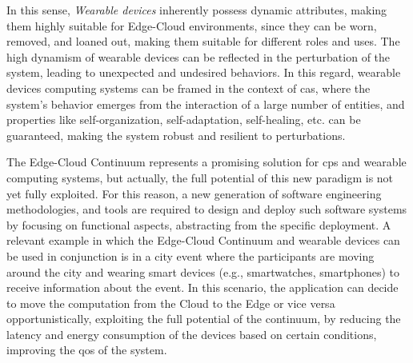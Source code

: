 \documentclass[12pt,a4paper]{article}
\newcommand{\meta}[1]{{\color{blue}#1}}
\begin{document}
In this sense,
\emph{Wearable devices} inherently possess dynamic attributes, making them highly suitable for Edge-Cloud environments,
since they can be worn,
removed, and loaned out,
making them suitable for different roles and uses.
%
The high dynamism of wearable devices can be reflected in the perturbation of the system,
leading to unexpected and undesired behaviors.
%
In this regard,
wearable devices computing systems can be framed in the context of \ac{cas},
where the system's behavior emerges from the interaction of a large number of entities,
and properties like self-organization, self-adaptation, self-healing, etc. can be guaranteed,
making the system robust and resilient to perturbations.

The Edge-Cloud Continuum represents a promising solution for \ac{cps} and wearable computing systems,
but actually,
the full potential of this new paradigm is not yet fully exploited.
%
For this reason,
a new generation of software engineering methodologies,
and tools are required to design and deploy such software systems by focusing on functional aspects,
abstracting from the specific deployment.
%
A relevant example in which the Edge-Cloud Continuum and wearable devices can be used in conjunction is
in a city event where the participants are moving around the city and wearing smart devices (e.g., smartwatches, smartphones) to receive information about the event.
%
In this scenario,
the application can decide to move the computation from the Cloud to the Edge or vice versa opportunistically,
exploiting the full potential of the continuum,
by reducing the latency and energy consumption of the devices based on certain conditions,
improving the \ac{qos} of the system.
\end{document}
